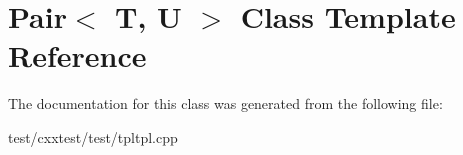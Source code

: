 \hypertarget{classPair}{\section{Pair$<$ T, U $>$ Class Template Reference}
\label{classPair}
}


The documentation for this class was generated from the following file\-:\begin{DoxyCompactItemize}
\item 
test/cxxtest/test/tpltpl.\-cpp\end{DoxyCompactItemize}

